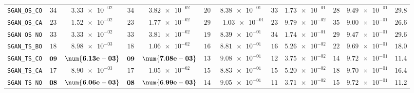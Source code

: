 \begin{table}[H]
\begin{tabularx}{\textwidth}{l||cC|cC|cC|cC|cC||c}
		\texttt{SGAN\_OS\_CO} & $ 34$ & $ \num{3.33e-02}$ & $ 34$ & $ \num{3.82e-02}$ & $ 20$ & $ \num{8.38e-01}$ & $ 33$ & $ \num{1.73e-01}$ & $ 28$ & $ \num{9.49e-01}$ & $ 29.8$  \\
		\texttt{SGAN\_OS\_CA} & $ 23$ & $ \num{1.52e-02}$ & $ 23$ & $ \num{1.77e-02}$ & $ 29$ & $ \num{-1.03e-01}$ & $ 23$ & $ \num{9.79e-02}$ & $ 35$ & $ \num{9.00e-01}$ & $ 26.6$  \\
		\texttt{SGAN\_OS\_NO} & $ 33$ & $ \num{3.33e-02}$ & $ 33$ & $ \num{3.81e-02}$ & $ 19$ & $ \num{8.39e-01}$ & $ 34$ & $ \num{1.74e-01}$ & $ 29$ & $ \num{9.47e-01}$ & $ 29.6$  \\
		\texttt{SGAN\_TS\_BO} & $ 18$ & $ \num{8.98e-03}$ & $ 18$ & $ \num{1.06e-02}$ & $ 16$ & $ \num{8.81e-01}$ & $ 16$ & $ \num{5.26e-02}$ & $ 22$ & $ \num{9.69e-01}$ & $ 18.0$  \\
		\texttt{SGAN\_TS\_CO} & $\bf 09$ & $\bf \num{6.13e-03}$ & $\bf 09$ & $\bf \num{7.08e-03}$ & $ 13$ & $ \num{9.08e-01}$ & $ 12$ & $ \num{3.75e-02}$ & $ 14$ & $ \num{9.72e-01}$ & $ 11.4$  \\
		\texttt{SGAN\_TS\_CA} & $ 17$ & $ \num{8.90e-03}$ & $ 17$ & $ \num{1.05e-02}$ & $ 15$ & $ \num{8.83e-01}$ & $ 15$ & $ \num{5.20e-02}$ & $ 18$ & $ \num{9.70e-01}$ & $ 16.4$  \\
		\texttt{SGAN\_TS\_NO} & $\bf 08$ & $\bf \num{6.06e-03}$ & $\bf 08$ & $\bf \num{6.99e-03}$ & $ 14$ & $ \num{9.05e-01}$ & $ 11$ & $ \num{3.71e-02}$ & $ 15$ & $ \num{9.72e-01}$ & $ 11.2$  \\ \hline

\end{tabularx}
\end{table}
